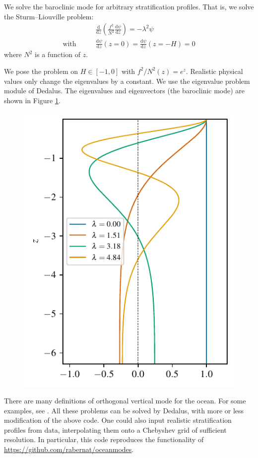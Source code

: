 \graphicspath{{Baroclinic_mode/code/figs/}}

We solve the baroclinic mode for arbitrary stratification profiles. That is, we solve the Sturm–Liouville problem:
\begin{align}
&\frac{\mathrm{d}}{\mathrm{d}z}\left( \frac{f^2}{N^2}\frac{\mathrm{d}\psi}{\mathrm{d}z} \right) = -\lambda^2\psi\\
\text{with}\qquad &\frac{\mathrm{d}\psi}{\mathrm{d}z}(z=0)=\frac{\mathrm{d}\psi}{\mathrm{d}z}(z=-H)=0
\end{align}
where $N^2$ is a function of $z$.

We pose the problem on $H\in[-1,0]$ with $f^2/N^2(z)=e^{z}$. Realistic physical values only change the eigenvalues by a constant. We use the eigenvalue problem module of Dedalus. The eigenvalues and eigenvectors (the baroclinic mode) are shown in Figure \ref{fig:expo_bc_mode}.

\begin{figure}
    \centering
    \includegraphics{expo_bc_mode}
    \caption{}
    \label{fig:expo_bc_mode}
\end{figure}

There are many definitions of orthogonal vertical mode for the ocean. For some examples, see \cite{SmithVanneste_13,LaCasce_17,YassinGriffies_22}. All these problems can be solved by Dedalus, with more or less modification of the above code. One could also input realistic stratification profiles from data, interpolating them onto a Chebyshev grid of sufficient resolution. In particular, this code reproduces the functionality of \url{https://github.com/rabernat/oceanmodes}. 